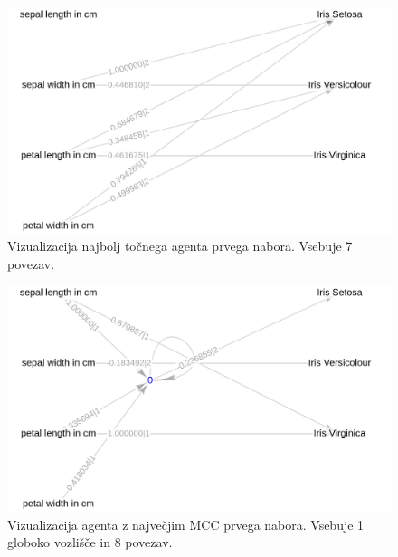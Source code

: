 \begin{figure}[H]
    \begin{center}
        \includegraphics[width=13cm]{iris/1/acc_g}
    \end{center}
    \caption{Vizualizacija najbolj točnega agenta prvega nabora. Vsebuje 7 povezav.}
    \label{fig:iris_acc_1_g}
\end{figure}

\begin{figure}[H]
    \begin{center}
        \includegraphics[width=13cm]{iris/1/mcc_g}
    \end{center}
    \caption{Vizualizacija agenta z največjim MCC prvega nabora. Vsebuje 1 globoko vozlišče in 8 povezav.}
    \label{fig:iris_mcc_1_g}
\end{figure}

